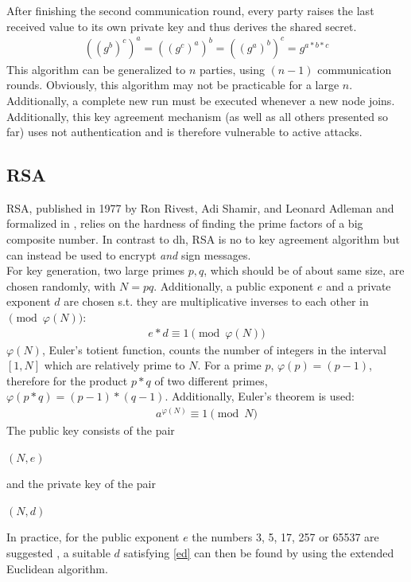 After finishing the second communication round, every party raises the last received value to its own private key and thus derives the shared secret.
\begin{align}
 ((g^b)^c)^a = ((g^c)^a)^b = ((g^a)^b)^c = g^{a*b*c}
\end{align}
This algorithm can be generalized to $n$ parties, using $(n-1)$ communication rounds. Obviously, this algorithm may not be practicable for a large $n$. Additionally,
a complete new run must be executed whenever a new node joins.
\\
Additionally, this key agreement mechanism (as well as all others presented so far) uses not authentication and is therefore vulnerable to active attacks.

\subsection{RSA}

RSA, published in 1977 by Ron Rivest, Adi Shamir, and Leonard Adleman \cite{RSA} and formalized in \cite{pkcs1},
relies on the hardness of finding the prime factors of a big composite number.
In contrast to \gls{dh}, RSA is no to key agreement algorithm but can instead be used to encrypt \textit{and} sign messages. 
\\
For key generation, 
two large primes $p, q$, which should be of about same size, are chosen randomly, with $N = pq$. Additionally, a public exponent $e$ and a private exponent
$d$ are chosen s.t. they are multiplicative inverses to each other in $\pmod{\varphi(N)}$:
\begin{align}\label{ed}
 e * d \equiv 1 \pmod {\varphi(N)}
\end{align}
$\varphi(N)$, Euler's totient function, counts the number of integers in the interval $[1, N]$ which are relatively prime to $N$.
For a prime $p$, $\varphi(p) = (p-1)$, therefore for the product
$p*q$ of two different primes, $\varphi(p*q) = (p-1) * (q-1)$.
Additionally, Euler's theorem is used:
\begin{align}\label{euler}
a^{\varphi(N)} \equiv 1 \pmod N
\end{align}
The public key consists of the pair
\begin{center}
 $(N, e)$
\end{center}
and the private key of the pair
\begin{center}
 $(N, d)$
\end{center}
In practice, for the public exponent $e$ the numbers 3, 5, 17, 257 or 65537 are suggested \cite{891000}, a suitable $d$ satisfying \ref{ed} can then be found
by using the extended Euclidean algorithm.

